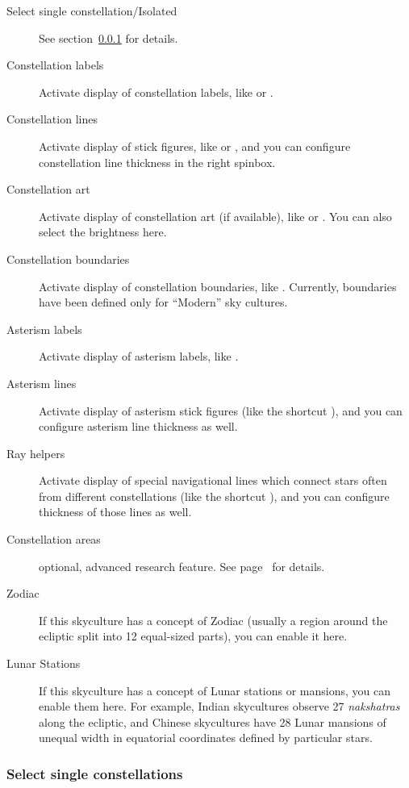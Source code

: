 \begin{description}
\item[Select single constellation/Isolated] See section~\ref{sec:skyculture:singleConstellations} for details.
\item[Constellation labels] Activate display of constellation labels, like
   or . 
\item[Constellation lines] Activate display of stick
  figures, like  or , and you
  can configure constellation line thickness in the right spinbox.
\item[Constellation art] Activate display of constellation
  art (if available), like  or
  . You can also select the brightness here.
\item[Constellation boundaries] Activate display of constellation boundaries,
  like . Currently, boundaries have been defined only for
  ``Modern'' sky cultures.
\item[Asterism labels] Activate display of asterism labels, like .
\item[Asterism lines] Activate display of asterism stick figures   
  (like the shortcut ), and you can configure asterism line thickness as well.
\item[Ray helpers] Activate display of special navigational lines which 
  connect stars often from different constellations (like the shortcut ),
  and you can configure thickness of those lines as well.
\item[Constellation areas] optional, advanced research feature. See page~\pageref{SC:constellation_area} for details. 
\item[Zodiac] If this skyculture has a concept of Zodiac (usually a region around the ecliptic split into 12 equal-sized parts), 
  you can enable it here. 
\item[Lunar Stations] If this skyculture has a concept of Lunar stations or mansions, you can enable them here. 
  For example, Indian skycultures observe 27 \emph{nakshatras} along the ecliptic, and Chinese skycultures have 28 Lunar 
  mansions of unequal width in equatorial coordinates defined by particular stars. 
\end{description}



\subsubsection{Select single constellations}
\label{sec:skyculture:singleConstellations}


